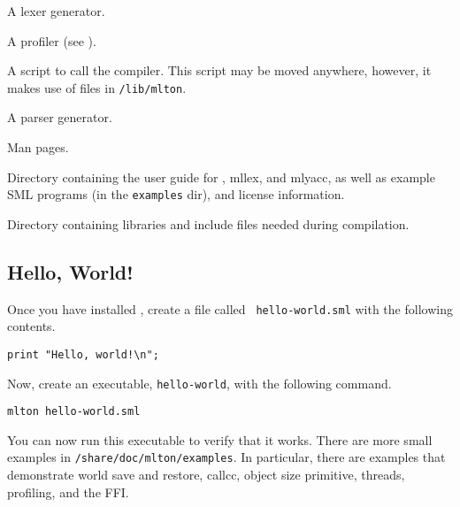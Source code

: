 \begin{description}

A lexer generator.

A profiler (see ).

A script to call the compiler.
This script may be moved anywhere, however,
it makes use of files in {\tt \prefix/lib/mlton}.

A parser generator.

Man pages.

Directory containing the user guide for {\mlton}, mllex, and mlyacc,
as well as example SML programs (in the {\tt examples} dir), and
license information.

Directory containing libraries and include files needed during
compilation.

\end{description}

\subsection{Hello, World!}

Once you have installed {\mlton}, create a file called {\tt
hello-world.sml} with the following contents.

\begin{verbatim}
print "Hello, world!\n";
\end{verbatim}
Now, create an executable, {\tt hello-world}, with the following command.
\begin{verbatim}
mlton hello-world.sml
\end{verbatim}
You can now run this executable to verify that it works.  There are
more small examples in {\tt \prefix/share/doc/mlton/examples}.  In
particular, there are examples that demonstrate world save and
restore, callcc, object size primitive, threads, profiling, and the
FFI.
